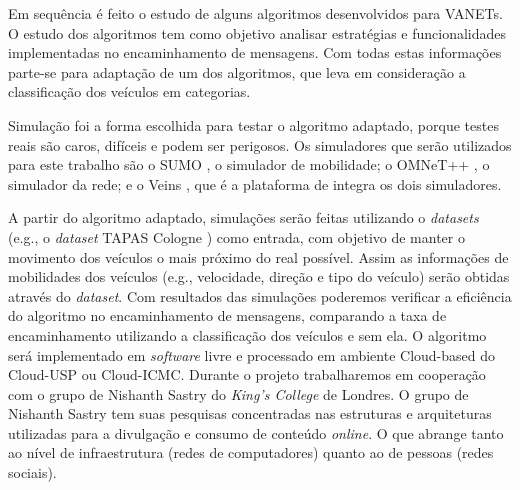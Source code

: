 \documentclass[mestrado, pre-defesa, english, brazil]{packages/icmc}
\begin{document}
Em sequência é feito o estudo de alguns algoritmos desenvolvidos para VANETs. O estudo dos algoritmos tem como objetivo analisar estratégias e funcionalidades implementadas no encaminhamento de mensagens. Com todas estas informações parte-se para adaptação de um dos algoritmos, que leva em consideração a classificação dos veículos em categorias.

Simulação foi a forma escolhida para testar o algoritmo adaptado, porque testes reais são caros, difíceis e podem ser perigosos. Os simuladores que serão utilizados para este trabalho são o SUMO \cite{SUMO-2012}, o simulador de mobilidade; o OMNeT++ \cite{OMNeT++-2014}, o simulador da rede; e o Veins \cite{Veins-2014}, que é a plataforma de integra os dois simuladores.

A partir do algoritmo adaptado, simulações serão feitas utilizando o \textit{datasets} (e.g., o \textit{dataset} TAPAS Cologne \cite{tapas-2014}) como entrada, com objetivo de manter o movimento dos veículos o mais próximo do real possível. Assim as informações de mobilidades dos veículos (e.g., velocidade, direção e tipo do veículo) serão obtidas através do \textit{dataset}. Com resultados das simulações poderemos verificar a eficiência do algoritmo no encaminhamento de mensagens, comparando a taxa de encaminhamento utilizando a classificação dos veículos e sem ela. O algoritmo será implementado em \textit{software} livre e processado em ambiente Cloud-based do Cloud-USP ou Cloud-ICMC. Durante o projeto trabalharemos em cooperação com o grupo de Nishanth Sastry do \emph{King's College} de Londres. O grupo de Nishanth Sastry tem suas pesquisas concentradas nas estruturas e arquiteturas utilizadas para a divulgação e consumo de conteúdo \textit{online}. O que abrange tanto ao nível de infraestrutura (redes de computadores) quanto ao de pessoas (redes sociais).

\end{document}
